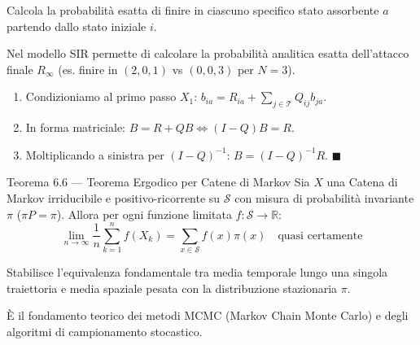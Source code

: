 \documentclass[11pt,a4paper]{report}
\newcommand{\1}{\mathbf{1}}
\begin{document}
\begin{cosafa}
Calcola la probabilità esatta di finire in ciascuno specifico stato assorbente $a$ partendo dallo stato iniziale $i$.
\end{cosafa}

\begin{acosaserve}
Nel modello SIR permette di calcolare la probabilità analitica esatta dell'attacco finale $R_\infty$ (es. finire in $(2,0,1)$ vs $(0,0,3)$ per $N=3$).
\end{acosaserve}

\begin{dimostrazione}
\begin{enumerate}
    \item Condizioniamo al primo passo $X_1$: $b_{ia} = R_{ia} + \sum_{j \in \mathcal{T}} Q_{ij} b_{ja}$.
    \item In forma matriciale: $B = R + QB \iff (I - Q)B = R$.
    \item Moltiplicando a sinistra per $(I-Q)^{-1}$: $B = (I - Q)^{-1} R$. $\blacksquare$
\end{enumerate}
\end{dimostrazione}

\vspace{0.4cm}

\begin{teoremabox}{Teorema 6.6 --- Teorema Ergodico per Catene di Markov}
Sia $X$ una Catena di Markov irriducibile e positivo-ricorrente su $\mathcal{S}$ con misura di probabilità invariante $\pi$ ($\pi P = \pi$). Allora per ogni funzione limitata $f: \mathcal{S} \to \mathbb{R}$:
\[ \lim_{n \to \infty} \frac{1}{n} \sum_{k=1}^n f(X_k) = \sum_{x \in \mathcal{S}} f(x) \pi(x) \quad \text{quasi certamente} \]
\end{teoremabox}

\begin{cosafa}
Stabilisce l'equivalenza fondamentale tra media temporale lungo una singola traiettoria e media spaziale pesata con la distribuzione stazionaria $\pi$.
\end{cosafa}

\begin{acosaserve}
È il fondamento teorico dei metodi MCMC (Markov Chain Monte Carlo) e degli algoritmi di campionamento stocastico.
\end{acosaserve}
\end{document}
